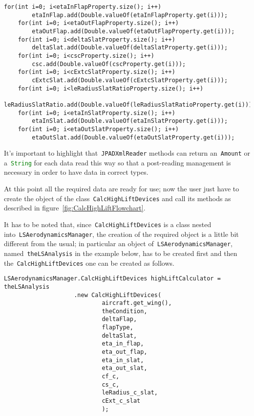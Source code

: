\begin{lstlisting}[caption={Excerpt of B747-100B test - Input data reading}, captionpos=b, tabsize=2]
	for(int i=0; i<etaInFlapProperty.size(); i++)
		etaInFlap.add(Double.valueOf(etaInFlapProperty.get(i)));
	for(int i=0; i<etaOutFlapProperty.size(); i++)
		etaOutFlap.add(Double.valueOf(etaOutFlapProperty.get(i)));
	for(int i=0; i<deltaSlatProperty.size(); i++)
		deltaSlat.add(Double.valueOf(deltaSlatProperty.get(i)));
	for(int i=0; i<cscProperty.size(); i++)
		csc.add(Double.valueOf(cscProperty.get(i)));
	for(int i=0; i<cExtcSlatProperty.size(); i++)
		cExtcSlat.add(Double.valueOf(cExtcSlatProperty.get(i)));
	for(int i=0; i<leRadiusSlatRatioProperty.size(); i++)
		leRadiusSlatRatio.add(Double.valueOf(leRadiusSlatRatioProperty.get(i)));
	for(int i=0; i<etaInSlatProperty.size(); i++)
		etaInSlat.add(Double.valueOf(etaInSlatProperty.get(i)));
	for(int i=0; i<etaOutSlatProperty.size(); i++)
		etaOutSlat.add(Double.valueOf(etaOutSlatProperty.get(i)));
\end{lstlisting}

\bigskip
\noindent
It's important to highlight that~\lstinline[language=Java]!JPADXmlReader! methods can return an~\lstinline[language=Java]!Amount!\cite{jscienceAmount} or a~\lstinline[language=Java]!String! for each data read this way so that a post-reading management is necessary in order to have data in correct types.

\bigskip
\noindent
At this point all the required data are ready for use; now the user just have to create the object of the class~\lstinline[language=Java]!CalcHighLiftDevices! and call its methods as described in figure~\ref{fig:CalcHighLiftFlowchart}.

It has to be noted that, since~\lstinline[language=Java]!CalcHighLiftDevices! is a class nested into~\lstinline[language=Java]!LSAerodynamicsManager!, the creation of the required object is a little bit different from the usual; in particular an object of~\lstinline[language=Java]!LSAerodynamicsManager!, named~\lstinline[language=Java]!theLSAnalysis! in the example below, has to be created first and then the~\lstinline[language=Java]!CalcHighLiftDevices! one can be created as follows.

\bigskip
\lstset{language=Java}
\begin{lstlisting}[caption={Excerpt of B747-100B test - calculator object creation}, captionpos=b, tabsize=2]
	LSAerodynamicsManager.CalcHighLiftDevices highLiftCalculator = theLSAnalysis
					.new CalcHighLiftDevices(
							aircraft.get_wing(),
							theCondition,
							deltaFlap,
							flapType,
							deltaSlat,
							eta_in_flap,
							eta_out_flap,
							eta_in_slat,
							eta_out_slat,
							cf_c,
							cs_c,
							leRadius_c_slat,
							cExt_c_slat
							);
\end{lstlisting}


